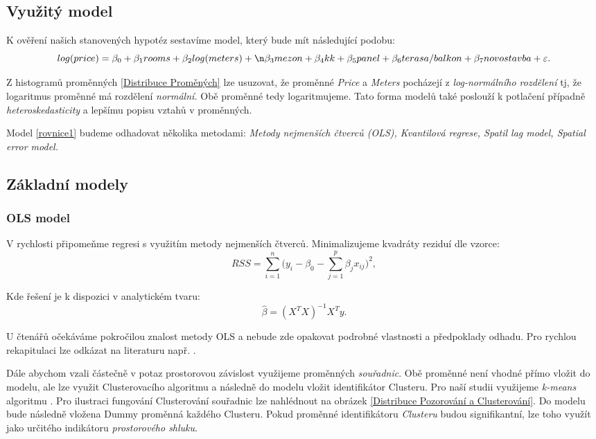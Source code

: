 \documentclass[11pt, a4paper]{article}
\begin{document}
\subsection{Využitý model}

K ověření našich stanovených hypotéz sestavíme model, který bude mít následující podobu:
\begin{equation} \label{rovnice1}
    log(price) = \beta_{0} +  \beta_{1}rooms  + \beta_{2}log(meters) + \n \beta_{3}mezon + \beta_{4}kk + \beta_{5}panel + \beta_{6}terasa/balkon + \beta_{7}novostavba + \varepsilon.
\end{equation}

Z histogramů proměnných \ref{Distribuce Proměných} lze usuzovat, že proměnné \textit{Price} a \textit{Meters} pocházejí z \textit{log-normálního rozdělení} tj, že logaritmus proměnné má rozdělení \textit{normální.} Obě proměnné tedy logaritmujeme. Tato forma modelů také poslouží k potlačení případně \textit{heteroskedasticity} a lepšímu popisu vztahů v proměnných.

Model \ref{rovnice1} budeme odhadovat několika metodami: \textit{Metody nejmenších čtverců (OLS), Kvantilová regrese, Spatil lag model, Spatial error model.}

\subsection{Základní modely}
\subsubsection{OLS model}

V rychlosti připomeňme regresi s využitím metody nejmenších čtverců. Minimalizujeme kvadráty reziduí dle vzorce:
$$RSS = \sum_{i = 1}^{n} \Big(y_{i} - \beta_{0} - \sum_{j = 1}^{p}\beta_{j}x_{ij}\Big)^2, $$

Kde řešení je k dispozici v analytickém tvaru:
$$\hat\beta = (X^{T}X)^{-1}X^{T}y.$$

U čtenářů očekáváme pokročilou znalost metody OLS a nebude zde opakovat podrobné vlastnosti a předpoklady odhadu. Pro rychlou rekapitulaci lze odkázat na literaturu např. \cite{wooldridge2016introductory-citovat_kapitolu}.

Dále abychom vzali částečně v potaz prostorovou závislost využijeme proměnných \textit{souřadnic}. Obě proměnné není vhodné přímo vložit do modelu, ale lze využit Clusterovacího algoritmu a následně do modelu vložit identifikátor Clusteru. Pro naší studii využijeme \textit{k-means} algoritmu \cite{james2013introduction}. Pro ilustraci fungování Clusterování souřadnic lze nahlédnout na obrázek \ref{Distribuce Pozorování a Clusterování}. Do modelu bude následně vložena Dummy proměnná každého Clusteru. Pokud proměnné identifikátoru \textit{Clusteru} budou signifikantní, lze toho využít jako určitého indikátoru \textit{prostorového shluku}.
\end{document}
